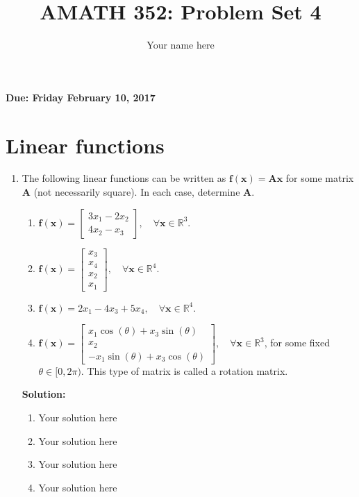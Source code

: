 \documentclass[]{article}
\title{AMATH 352: Problem Set 4}
\author{Your name here}
\newcommand{\R}{\mathbb{R}}				%
\newcommand{\bbm}{\begin{bmatrix}}		%
\newcommand{\ebm}{\end{bmatrix}}		%
\newcommand{\x}{\bm{x}}					%
\newcommand{\A}{\bm{A}}					%
\newcommand{\solution}{\vskip 0.5cm \textbf{\large Solution:} \\}
\begin{document}
\maketitle
{\Large \textbf{Due: Friday February 10, 2017}} \\

\vskip 1cm

\section*{Linear functions}
\begin{enumerate}
	\item The following linear functions can be written as $\bm{f}(\x)=\A\x$ for some matrix $\A$ (not necessarily square). In each case, determine $\A$.
	\begin{enumerate}
		\item $\bm{f}(\x) = \bbm 3x_1-2x_2\\4x_2-x_3 \ebm,\quad\forall\x\in\R^3$.
		\item $\bm{f}(\x) = \bbm x_3\\x_4\\x_2\\x_1 \ebm,\quad\forall\x\in\R^4$.
		\item $\bm{f}(\x) = 2x_1-4x_3+5x_4,\quad\forall\x\in\R^4$.
		\item $\bm{f}(\x) = \bbm x_1\cos(\theta)+x_3\sin(\theta)\\x_2\\-x_1\sin(\theta)+x_3\cos(\theta) \ebm,\quad\forall\x\in\R^3$, for some fixed\\ $\theta\in[0,2\pi)$. This type of matrix is called a rotation matrix.
	\end{enumerate}

	\solution
	\begin{enumerate}
		\item Your solution here 
		\item Your solution here
		\item Your solution here
		\item Your solution here
	\end{enumerate}
\end{enumerate}
\end{document}

